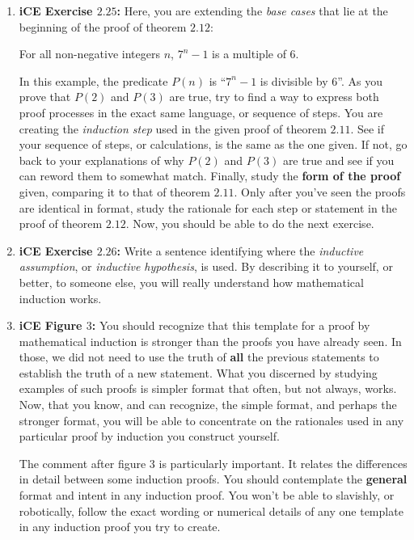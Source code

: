 \documentclass[12pt,letterpaper]{article}
\theoremstyle{definition}
\begin{document}
\begin{enumerate}
    \item {\bfseries iCE Exercise $2.25$:} Here, you are extending the \textit{base cases} that lie at the beginning of the proof of theorem $2.12$:
    \begin{center}
         For all non-negative integers $n$, $7^n - 1$ is a multiple of $6$.
    \end{center}
    In this example, the predicate $P(n)$ is ``$7^n-1$ is divisible by $6$''.
    As you prove that $P(2)$ and $P(3)$ are true, try to find a way to express both proof processes in the exact same language, or sequence of steps. You are creating the \textit{induction step} used in the given proof of theorem $2.11$. See if your sequence of steps, or calculations, is the same as the one given. If not, go back to your explanations of why $P(2)$ and $P(3)$ are true and see if you can reword them to somewhat match. Finally, study the \textbf{form of the proof} given, comparing it to that of theorem $2.11$. Only after you've seen the proofs are identical in format, study the rationale for each step or statement in the proof of theorem $2.12$. Now, you should be able to do the next exercise.
    
    
    \item {\bfseries iCE Exercise $2.26$:} Write a sentence identifying where the \textit{inductive assumption}, or \textit{inductive hypothesis}, is used. By describing it to yourself, or better, to someone else, you will really understand how mathematical induction works.
    
    \item {\bfseries iCE Figure $3$:} You should recognize that this template for a proof by mathematical induction is stronger than the proofs you have already seen. In those, we did not need to use the truth of \textbf{all} the previous statements to establish the truth of a new statement. What you discerned by studying examples of such proofs is simpler format that often, but not always, works. Now, that you know, and can recognize, the simple format, and perhaps the stronger format, you will be able to concentrate on the rationales used in any particular proof by induction you construct yourself.
    
    The comment after figure $3$ is particularly important. It relates the differences in detail between some induction proofs. You should contemplate the \textbf{general} format and intent in any induction proof. You won't be able to slavishly, or robotically, follow the exact wording or numerical details of any one template in any induction proof you try to create.
    

\end{enumerate}
\end{document}
